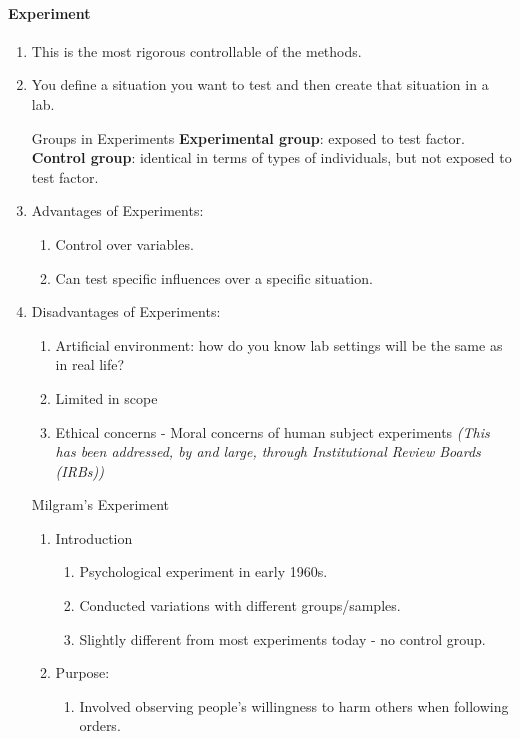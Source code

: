 \documentclass[12pt,a4paper]{article}
\begin{document}
\paragraph{Experiment}
\begin{enumerate}
	\item This is the most rigorous controllable of the methods. 
	\item You define a situation you want to test and then create that situation in a lab. 
	\begin{df}{Groups in Experiments}
		\textbf{Experimental group}: exposed to test factor.\\
		\textbf{Control group}: identical in terms of types of individuals, but not exposed to test factor. 
	\end{df}
	\item Advantages of Experiments: 
	\begin{enumerate}
		\item Control over variables. 
		\item Can test specific influences over a specific situation.
	\end{enumerate}
	\item Disadvantages of Experiments: 
	\begin{enumerate}
		\item Artificial environment: how do you know lab settings will be the same as in real life? 
		\item Limited in scope
		\item Ethical concerns - Moral concerns of human subject experiments \textit{(This has been addressed, by and large, through Institutional Review Boards (IRBs))}
	\end{enumerate}
	\begin{eg}{Milgram's Experiment}
		\begin{enumerate}
			\item Introduction
			\begin{enumerate}
				\item Psychological experiment in early 1960s. 
				\item Conducted variations with different groups/samples. 
				\item Slightly different from most experiments today - no control group. 
			\end{enumerate}
			\item Purpose: 
			\begin{enumerate}
				\item Involved observing people's willingness to harm others when following orders. 

\end{enumerate}
\end{enumerate}
\end{eg}
\end{enumerate}
\end{document}
